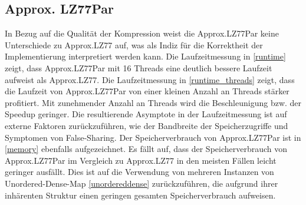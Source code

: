 \subsection{Approx. LZ77Par}
In Bezug auf die Qualität der Kompression weist die Approx.LZ77Par keine Unterschiede zu Approx.LZ77 auf, was als Indiz für die Korrektheit der Implementierung
interpretiert werden kann. Die Laufzeitmessung in \ref{runtime} zeigt, dass Approx.LZ77Par mit 16 Threads eine deutlich bessere Laufzeit aufweist als Approx.LZ77.
Die Laufzeitmessung in \ref{runtime_threads} zeigt, dass die Laufzeit von Approx.LZ77Par von einer kleinen Anzahl an Threads stärker profitiert. Mit zunehmender 
Anzahl an Threads wird die Beschleunigung bzw. der Speedup geringer. Die resultierende Asymptote in der Laufzeitmessung ist auf externe Faktoren zurückzuführen,
wie der Bandbreite der Speicherzugriffe und Symptomen von False-Sharing. Der Speicherverbrauch von Approx.LZ77Par ist in \ref{memory} ebenfalls aufgezeichnet.
Es fällt auf, dass der Speicherverbrauch von Approx.LZ77Par im Vergleich zu Approx.LZ77 in den meisten Fällen leicht geringer ausfällt. 
Dies ist auf die Verwendung von mehreren Instanzen von Unordered-Dense-Map \ref{unordereddense} zurückzuführen, die aufgrund ihrer inhärenten Struktur einen 
geringen gesamten Speicherverbrauch aufweisen.